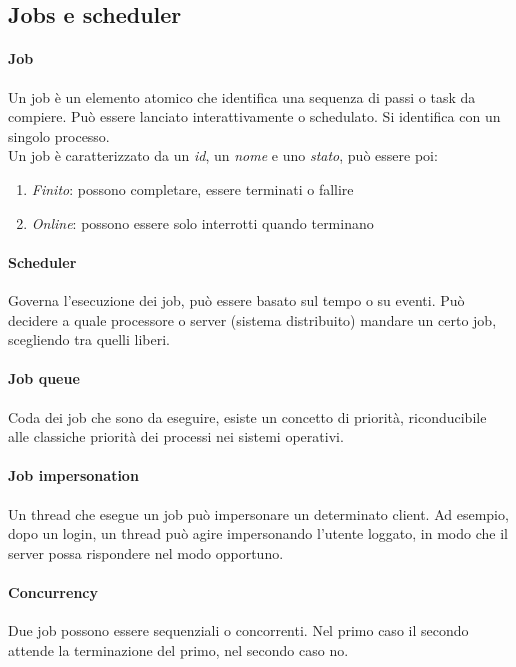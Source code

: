\subsection{Jobs e scheduler}
\paragraph{Job}
Un job è un elemento atomico che identifica una sequenza di passi o task da compiere. 
Può essere lanciato interattivamente o schedulato. Si identifica con 
un singolo processo.\\
Un job è caratterizzato da un \emph{id}, un \emph{nome} e uno \emph{stato}, può essere poi:
\begin{enumerate}
    \item \emph{Finito}: possono completare, essere terminati o fallire
    \item \emph{Online}: possono essere solo interrotti quando terminano
\end{enumerate}

\paragraph{Scheduler}
Governa l'esecuzione dei job, può essere basato sul tempo o su eventi.
Può decidere a quale processore o server (sistema distribuito) mandare un certo job, scegliendo 
tra quelli liberi.

\paragraph{Job queue}
Coda dei job che sono da eseguire, esiste un concetto di priorità, riconducibile alle classiche 
priorità dei processi nei sistemi operativi.

\paragraph{Job impersonation}
Un thread che esegue un job può impersonare un determinato client.
Ad esempio, dopo un login, un thread può agire impersonando l'utente loggato, 
in modo che il server possa rispondere nel modo opportuno.

\paragraph{Concurrency}
Due job possono essere sequenziali o concorrenti.
Nel primo caso il secondo attende la terminazione del primo, nel secondo caso no.
